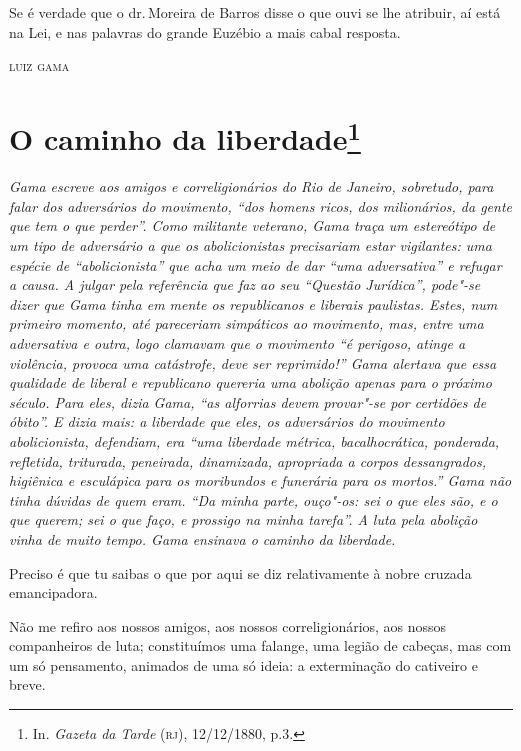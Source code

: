 Se é verdade que o dr.\,Moreira de Barros disse o que ouvi se lhe
atribuir, aí está na Lei, e nas palavras do grande Euzébio a mais cabal
resposta.

\bigskip

\hfill\textsc{luiz gama}

\chapter{O caminho da liberdade\footnote[*]{In. \emph{Gazeta da Tarde}
  (\textsc{rj}), 12/12/1880, p.3.}}

\begin{flushleft}
{\footnotesize\itshape
Gama escreve aos amigos e correligionários do Rio de Janeiro,
sobretudo, para falar dos adversários do movimento, ``dos homens ricos,
dos milionários, da gente que tem o que perder''. Como militante
veterano, Gama traça um estereótipo de um tipo de adversário a que os
abolicionistas precisariam estar vigilantes: uma espécie de
``abolicionista'' que acha um meio de dar ``uma adversativa'' e refugar a
causa. A julgar pela referência que faz ao seu ``Questão Jurídica'',
pode"-se dizer que Gama tinha em mente os republicanos e liberais
paulistas. Estes, num primeiro momento, até pareceriam simpáticos ao
movimento, mas, entre uma adversativa
e outra, logo clamavam que o movimento ``é perigoso, atinge a violência,
provoca uma catástrofe, deve ser reprimido!'' Gama alertava que essa
qualidade de liberal e republicano quereria uma abolição apenas para o
próximo século. Para eles, dizia Gama, ``as alforrias devem provar"-se por
certidões de óbito''. E dizia mais: a liberdade que eles, os adversários
do movimento abolicionista, defendiam, era ``uma liberdade métrica,
bacalhocrática, ponderada, refletida, triturada, peneirada, dinamizada,
apropriada a corpos dessangrados, higiênica e esculápica para os
moribundos e funerária para os mortos.'' Gama não tinha dúvidas de quem
eram. ``Da minha parte, ouço"-os: sei o que eles são, e o que querem; sei
o que faço, e prossigo na minha tarefa''. A luta pela abolição vinha de
muito tempo. Gama ensinava o caminho da liberdade. }
\end{flushleft}

\noindent{}Preciso é que tu saibas o que por aqui se diz relativamente à nobre
cruzada emancipadora.

Não me refiro aos nossos amigos, aos nossos correligionários, aos nossos
companheiros de luta; constituímos uma falange, uma legião de cabeças,
mas com um só pensamento, animados de uma só ideia: a exterminação do
cativeiro e breve.

